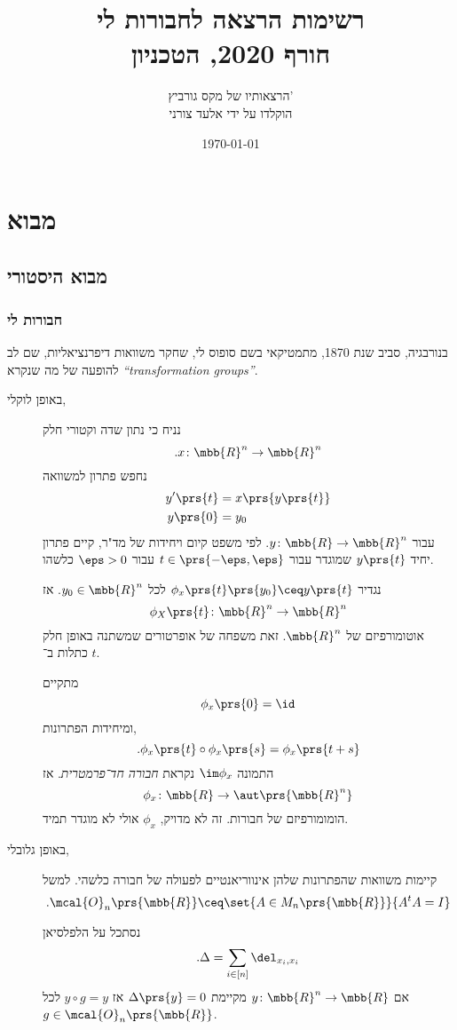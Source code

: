 \documentclass[10pt, twoside]{book}
\title{רשימות הרצאה לחבורות לי \\ \large{חורף 2020, הטכניון}}
\author{הרצאותיו של מקס גורביץ' \\ \large \small{הוקלדו על ידי אלעד צורני}}
\date{\today}
\newcommand{\textenglish}[1]{\foreignlanguage{english}{#1}}
\begin{document}
\maketitle
\tableofcontents

\chapter{מבוא}

\section{מבוא היסטורי}

\subsection{חבורות לי}

בנורבגיה, סביב שנת 1870, מתמטיקאי בשם סופוס לי, שחקר משוואות דיפרנציאליות, שם לב להופעה של מה שנקרא
\textenglish{\emph{``transformation groups''}}.

\begin{description}
\item[באופן לוקלי,]
נניח כי נתון שדה וקטורי חלק
\[\text{.} x \colon \mbb{R}^n \to \mbb{R}^n\]
נחפש פתרון למשוואה
\begin{align*}
y'\prs{t} &= x\prs{y\prs{t}} \\
y\prs{0} &= y_0
\end{align*}
עבור
$y \colon \mbb{R} \to \mbb{R}^n$.
לפי משפט קיום ויחידות של מד"ר, קיים פתרון יחיד
$y\prs{t}$
שמוגדר עבור
$t \in \prs{-\eps, \eps}$
עבור
$\eps > 0$
כלשהו.

נגדיר
$\phi_x\prs{t} \prs{y_0} \ceq y\prs{t}$
לכל
$y_0 \in \mbb{R}^n$.
אז
\[\phi_X\prs{t} \colon \mbb{R}^n \to \mbb{R}^n\]
אוטומורפיזם של
$\mbb{R}^n$.
זאת משפחה של אופרטורים שמשתנה באופן חלק כתלות ב־%
$t$.

מתקיים
\[\phi_x\prs{0} = \id\]
ומיחידות הפתרונות,
\[ \text{.} \phi_x\prs{t} \circ \phi_x\prs{s} = \phi_x\prs{t+s}\]
התמונה
$\im\phi_x$
נקראת
\emph{חבורה חד־פרמטרית}.
אז
\[\phi_x \colon \mbb{R} \to \aut\prs{\mbb{R}^n}\]
הומומורפיזם של חבורות.
זה לא מדויק, $\phi_x$ אולי לא מוגדר תמיד.

\item[באופן גלובלי,]
קיימות משוואות שהפתרונות שלהן אינווריאנטיים לפעולה של חבורה כלשהי. למשל
\[\text{.} \mcal{O}_n\prs{\mbb{R}} \ceq \set{A \in M_n\prs{\mbb{R}}}{A^t A = I}\]

נסתכל על הלפלסיאן
\[\text{.} \Delta = \sum_{i \in [n]} \del_{x_i, x_i}\]
אם
$y \colon \mbb{R}^n \to \mbb{R}$
מקיימת
$\Delta\prs{y} = 0$
אז
$y \circ g = y$
לכל
$g \in \mcal{O}_n\prs{\mbb{R}}$.
\end{description}
\end{document}

